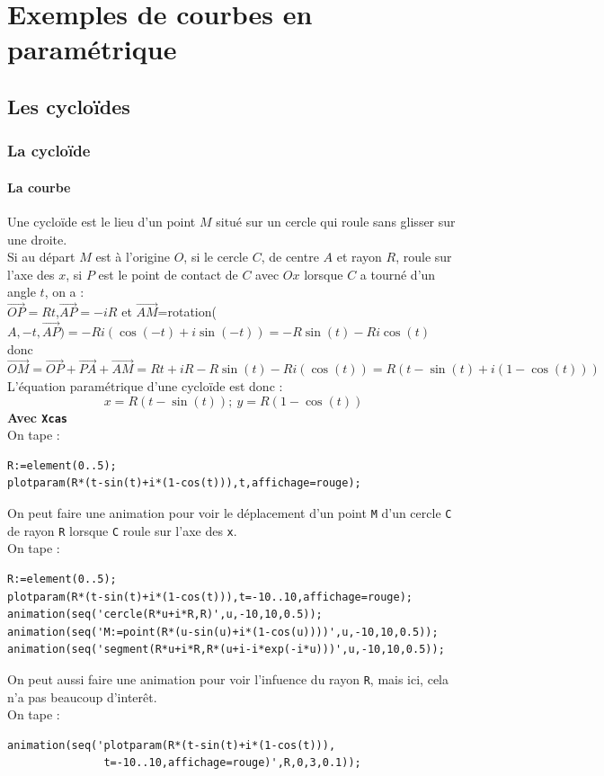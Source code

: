 \documentclass[a4paper,11pt]{book}
\begin{document}
\chapter{Exemples de courbes en param\'etrique}
\section{Les cyclo\"ides}
\subsection{La cyclo\"ide}
\subsubsection{La courbe}
Une cyclo\"ide est le lieu d'un point $M$ situ\'e sur un cercle qui roule sans 
glisser sur une droite.\\
Si au d\'epart $M$ est \`a l'origine $O$, si le cercle $C$, de centre $A$ et 
rayon $R$, roule sur l'axe des $x$, si $P$ est le point de contact de $C$ avec 
$Ox$ lorsque $C$ 
a tourn\'e d'un angle $t$, on a :\\
$\overrightarrow{OP}=Rt$,$\overrightarrow{AP}=-iR$  et 
$\overrightarrow{AM}$=rotation($A,-t,\overrightarrow{AP})=-Ri(\cos(-t)+i\sin(-t))=-R\sin(t)-Ri\cos(t)$ donc\\
$\overrightarrow{OM}=\overrightarrow{OP}+\overrightarrow{PA}+\overrightarrow{AM}=Rt+iR-R\sin(t)-Ri(\cos(t))=R(t-\sin(t)+i(1-\cos(t)))$\\
L'\'equation param\'etrique d'une cyclo\"ide est donc :\\
$$x=R(t-\sin(t));\ y=R(1-\cos(t))$$
{\bf Avec {\tt Xcas}}\\
On tape :
\begin{verbatim}
R:=element(0..5);
plotparam(R*(t-sin(t)+i*(1-cos(t))),t,affichage=rouge);
\end{verbatim}
On peut faire une animation pour voir le d\'eplacement d'un point {\tt M} 
d'un cercle {\tt C} de 
rayon {\tt R} lorsque {\tt C} roule sur l'axe des {\tt x}.\\
On tape :
\begin{verbatim}
R:=element(0..5);
plotparam(R*(t-sin(t)+i*(1-cos(t))),t=-10..10,affichage=rouge);
animation(seq('cercle(R*u+i*R,R)',u,-10,10,0.5));
animation(seq('M:=point(R*(u-sin(u)+i*(1-cos(u))))',u,-10,10,0.5));
animation(seq('segment(R*u+i*R,R*(u+i-i*exp(-i*u)))',u,-10,10,0.5));
\end{verbatim}
On peut aussi faire une animation pour voir l'infuence du rayon {\tt R}, mais 
ici, cela n'a pas beaucoup d'inter\^et.\\
On tape :
\begin{verbatim}
animation(seq('plotparam(R*(t-sin(t)+i*(1-cos(t))),
               t=-10..10,affichage=rouge)',R,0,3,0.1));
\end{verbatim}
\end{document}
